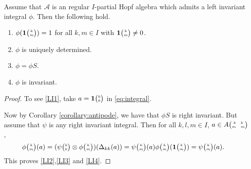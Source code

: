 \begin{Lem} Assume that $\mathscr{A}$ is an regular  $I$-partial Hopf algebra which admits a left invariant integral $\phi$. Then the following hold.
\begin{enumerate}[label = {(\arabic*)}]
\item\label{LI1} $\phi(\mathbf{1}{\tiny {\begin{pmatrix} k\\m\end{pmatrix}}})=1$ for all $k,m\in I$ with $\mathbf{1}{\tiny {\begin{pmatrix} k\\m\end{pmatrix}}}\neq 0$.
\item\label{LI2} $\phi$ is uniquely determined.
\item\label{LI3} $\phi=\phi S$.
\item\label{LI4} $\phi$ is invariant.
\end{enumerate}
\end{Lem}

\begin{proof} 
To see \ref{LI1}, take $a=\mathbf{1}{\tiny {\begin{pmatrix} k\\k\end{pmatrix}}}$ in \eqref{eq:integral}. 

Now by Corollary \ref{corollary:antipode}, we have that $\phi S$ is right invariant. But assume that $\psi$ is any
 right invariant integral.     Then for all $k,l,m\in I$, $a\in A{\tiny \begin{pmatrix} k \quad k \\ m \quad m\end{pmatrix}}$,
    \begin{align*}
      \phi{\tiny {\begin{pmatrix} k\\m\end{pmatrix}}}(a)  &= (\psi{\tiny {\begin{pmatrix} k\\k\end{pmatrix}}} \otimes
      \phi{\tiny {\begin{pmatrix} k\\m\end{pmatrix}}})(\Delta_{kk}(a)) = \psi{\tiny {\begin{pmatrix} k\\m\end{pmatrix}}}(a)\phi{\tiny {\begin{pmatrix} k\\m\end{pmatrix}}}(\mathbf{1}{\tiny {\begin{pmatrix} k\\m\end{pmatrix}}}) = \psi{\tiny {\begin{pmatrix} k\\m\end{pmatrix}}}(a) .
    \end{align*}
  This proves \ref{LI2},\ref{LI3} and \ref{LI4}.  
    


    
 \end{proof} 


